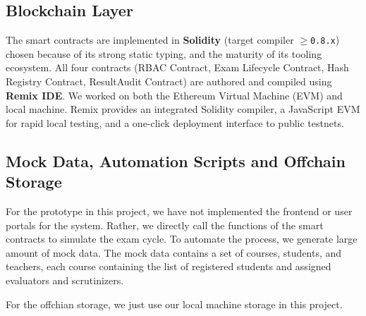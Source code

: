 \documentclass[conference]{IEEEtran}
\begin{document}

\subsection{Blockchain Layer}

The smart contracts are implemented in \textbf{Solidity} (target compiler
\texttt{$\geq$0.8.x}) chosen because of its strong static typing, and the maturity of its tooling
ecosystem. All four contracts (RBAC Contract,
Exam Lifecycle Contract, Hash Registry Contract,
ResultAudit Contract) are authored and compiled using
\textbf{Remix IDE}. We worked on both the Ethereum Virtual
Machine (EVM) and local machine. Remix
provides an integrated Solidity compiler, a JavaScript EVM for rapid local
testing, and a one-click deployment interface to public testnets.



\subsection{Mock Data, Automation Scripts and Offchain Storage}

For the prototype in this project, we have not implemented the frontend or user portals for the system. Rather, we directly call the functions of the smart contracts to simulate the exam cycle. To automate the process, we generate large amount of mock data. The mock data contains a set of courses, students, and teachers, each course containing the list of registered students and assigned evaluators and scrutinizers. 

For the offchian storage, we just use our local machine storage in this project.



\end{document}
